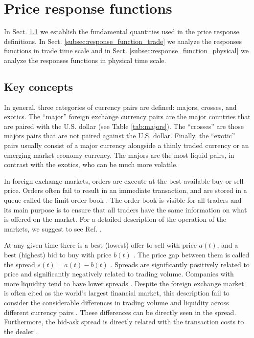\section{Price response functions}
\label{sec:response_functions}
In Sect. \ref{subsec:key_concepts} we establish the fundamental quantities used
in the price response definitions.
In Sect. \ref{subsec:response_function_trade} we analyze the responses
functions in trade time scale and in Sect. \ref{subsec:response_function_physical}
we analyze the responses functions in physical time scale.

\subsection{Key concepts}\label{subsec:key_concepts}

In general, three categories of currency pairs are defined: majors, crosses,
and exotics. The ``major'' foreign exchange currency pairs are the major
countries that are paired with the U.S. dollar (see Table \ref{tab:majors}).
The ``crosses'' are those majors pairs that are not paired against the U.S.
dollar. Finally, the ``exotic'' pairs usually consist of a major currency
alongside a thinly traded currency or an emerging market economy currency.
The majors are the most liquid pairs, in contrast with the exotics, who can be
much more volatile.

In foreign exchange markets, orders are execute at the best available buy or
sell price. Orders often fail to result in an immediate transaction, and are
stored in a queue called the limit order book
\cite{stat_prop,predictive_pow,forex_structure,intro_market_micro,prop_order_book}.
The order book is visible for all traders and its main purpose is to ensure
that all traders have the same information on what is offered on the market.
For a detailed description of the operation of the markets, we suggest to see
Ref. \cite{my_paper_response_financial}.

At any given time there is a best (lowest) offer to sell with price
$a\left(t\right)$, and a best (highest) bid to buy with price $b\left(t\right)$
\cite{subtle_nature,account_spread,limit_ord_spread,prop_order_book,stat_theory}.
The price gap between them is called the spread
$s\left(t\right) = a\left(t\right)-b\left(t\right)$
\cite{subtle_nature,market_digest,Bouchaud_2004,account_spread,teach_spread,large_prices_changes,em_stylized_facts,stat_theory}.
Spreads are significantly positively related to price and significantly
negatively related to trading volume. Companies with more liquidity tend to
have lower spreads
\cite{components_spread_tokyo,effects_spread,account_spread,components_spread}.
Despite the foreign exchange market is often cited as the world's largest
financial market, this description fail to consider the considerable differences
in trading volume and liquidity across different currency pairs
\cite{forex_microstructure}. These differences can be directly seen in the
spread. Furthermore, the bid-ask spread is directly related with the
transaction costs to the dealer \cite{teach_spread,spread_futures}.

